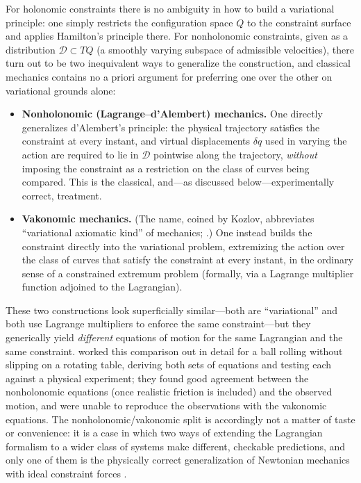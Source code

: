 \documentclass[11pt]{article}
\begin{document}
For holonomic constraints there is no ambiguity in how to build a variational principle: one simply restricts the configuration space $Q$ to the constraint surface and applies Hamilton's principle there. For nonholonomic constraints, given as a distribution $\mathcal{D}\subset TQ$ (a smoothly varying subspace of admissible velocities), there turn out to be two inequivalent ways to generalize the construction, and classical mechanics contains no a priori argument for preferring one over the other on variational grounds alone:

\begin{itemize}[leftmargin=1.4em]
\item \textbf{Nonholonomic (Lagrange--d'Alembert) mechanics.} One directly generalizes d'Alembert's principle: the physical trajectory satisfies the constraint at every instant, and virtual displacements $\delta q$ used in varying the action are required to lie in $\mathcal{D}$ pointwise along the trajectory, \emph{without} imposing the constraint as a restriction on the class of curves being compared. This is the classical, and---as discussed below---experimentally correct, treatment.
\item \textbf{Vakonomic mechanics.} (The name, coined by Kozlov, abbreviates ``variational axiomatic kind'' of mechanics; \citealp{kozlov1983,akn2006}.) One instead builds the constraint directly into the variational problem, extremizing the action over the class of curves that satisfy the constraint at every instant, in the ordinary sense of a constrained extremum problem (formally, via a Lagrange multiplier function adjoined to the Lagrangian).
\end{itemize}

These two constructions look superficially similar---both are ``variational'' and both use Lagrange multipliers to enforce the same constraint---but they generically yield \emph{different} equations of motion for the same Lagrangian and the same constraint. \citet{lewismurray1995} worked this comparison out in detail for a ball rolling without slipping on a rotating table, deriving both sets of equations and testing each against a physical experiment; they found good agreement between the nonholonomic equations (once realistic friction is included) and the observed motion, and were unable to reproduce the observations with the vakonomic equations. The nonholonomic/vakonomic split is accordingly not a matter of taste or convenience: it is a case in which two ways of extending the Lagrangian formalism to a wider class of systems make different, checkable predictions, and only one of them is the physically correct generalization of Newtonian mechanics with ideal constraint forces \citep{neimarkfufaev1972,bloch2003}.
\end{document}
